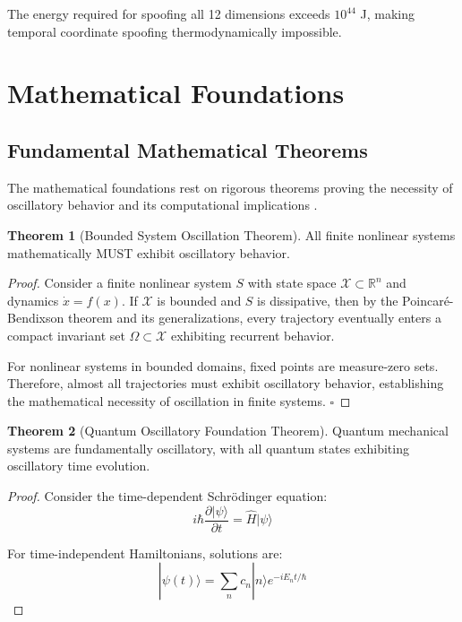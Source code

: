 \documentclass[12pt,a4paper]{article}
\theoremstyle{definition}
\newtheorem{theorem}{Theorem}[section]
\begin{document}
{The energy required for spoofing all 12 dimensions exceeds $10^{44}$ J, making temporal coordinate spoofing thermodynamically impossible.

\section{Mathematical Foundations}

\subsection{Fundamental Mathematical Theorems}

The mathematical foundations rest on rigorous theorems proving the necessity of oscillatory behavior and its computational implications \cite{sachikonye2024oscillatory}.

\begin{theorem}[Bounded System Oscillation Theorem]
All finite nonlinear systems mathematically MUST exhibit oscillatory behavior.
\end{theorem}

\begin{proof}
Consider a finite nonlinear system $S$ with state space $\mathcal{X} \subset \mathbb{R}^n$ and dynamics $\dot{x} = f(x)$. If $\mathcal{X}$ is bounded and $S$ is dissipative, then by the Poincaré-Bendixson theorem and its generalizations, every trajectory eventually enters a compact invariant set $\Omega \subset \mathcal{X}$ exhibiting recurrent behavior.

For nonlinear systems in bounded domains, fixed points are measure-zero sets. Therefore, almost all trajectories must exhibit oscillatory behavior, establishing the mathematical necessity of oscillation in finite systems. $\square$
\end{proof}

\begin{theorem}[Quantum Oscillatory Foundation Theorem]
Quantum mechanical systems are fundamentally oscillatory, with all quantum states exhibiting oscillatory time evolution.
\end{theorem}

\begin{proof}
Consider the time-dependent Schrödinger equation:
$$i\hbar \frac{\partial |\psi\rangle}{\partial t} = \hat{H} |\psi\rangle$$

For time-independent Hamiltonians, solutions are:
$$|\psi(t)\rangle = \sum_n c_n |n\rangle e^{-iE_n t/\hbar}$$


\end{proof}}
\end{document}

